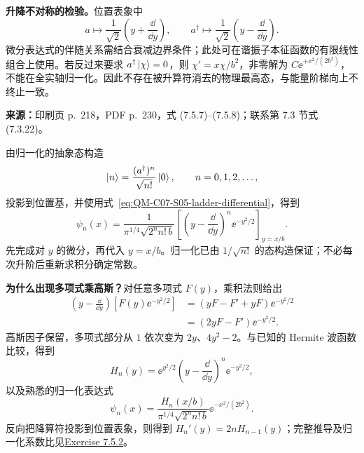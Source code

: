\textbf{升降不对称的检验。}位置表象中
\begin{equation}
  a\mapsto\frac1{\sqrt2}\left(y+\frac{\dd}{\dd y}\right),\qquad
  a^\dagger\mapsto\frac1{\sqrt2}\left(y-\frac{\dd}{\dd y}\right).
  \label{eq:QM-C07-S05-ladder-differential}
\end{equation}
微分表达式的伴随关系需结合衰减边界条件；此处可在谐振子本征函数的有限线性组合上使用。若反过来要求 $a^\dagger\left|\chi\right\rangle=0$，则 $\chi'=x\chi/b^2$，非零解为 $C\ee^{+x^2/(2b^2)}$，不能在全实轴归一化。因此不存在被升算符消去的物理最高态，与能量阶梯向上不终止一致。

\textbf{来源：}印刷页 p.~218，PDF p.~230，式 (7.5.7)--(7.5.8)；联系第 7.3 节式 (7.3.22)。

由归一化的抽象态构造
\begin{equation}
  \left|n\right\rangle=\frac{(a^\dagger)^n}{\sqrt{n!}}\left|0\right\rangle,\qquad n=0,1,2,\ldots,
\end{equation}
投影到位置基，并使用式~\eqref{eq:QM-C07-S05-ladder-differential}，得到
\begin{equation}
  \boxed{\psi_n(x)=\frac1{\pi^{1/4}\sqrt{2^n n!\,b}}
    \left[\left(y-\frac{\dd}{\dd y}\right)^n
      \ee^{-y^2/2}\right]_{y=x/b}}.
  \label{eq:QM-C07-S05-generated-functions}
\end{equation}
先完成对 $y$ 的微分，再代入 $y=x/b$。归一化已由 $1/\sqrt{n!}$ 的态构造保证；不必每次升阶后重新求积分确定常数。

\textbf{为什么出现多项式乘高斯？}对任意多项式 $F(y)$，乘积法则给出
\begin{align}
  \left(y-\frac{\dd}{\dd y}\right)
    \left[F(y)\ee^{-y^2/2}\right]
    &=\left(yF-F'+yF\right)\ee^{-y^2/2}\\
    &=\left(2yF-F'\right)\ee^{-y^2/2}.
\end{align}
高斯因子保留，多项式部分从 $1$ 依次变为 $2y$、$4y^2-2$。与已知的 Hermite 波函数比较，得到
\begin{equation}
  \boxed{H_n(y)=\ee^{y^2/2}
    \left(y-\frac{\dd}{\dd y}\right)^n\ee^{-y^2/2}},
\end{equation}
以及熟悉的归一化表达式
\begin{equation}
  \boxed{\psi_n(x)=\frac{H_n(x/b)}{\pi^{1/4}\sqrt{2^n n!\,b}}
        \ee^{-x^2/(2b^2)}}.
  \label{eq:QM-C07-S05-hermite-functions}
\end{equation}
反向把降算符投影到位置表象，则得到 $H_n'(y)=2nH_{n-1}(y)$；完整推导及归一化系数比见\hyperref[exercise:QM-C07-S05-E02]{Exercise 7.5.2}。

